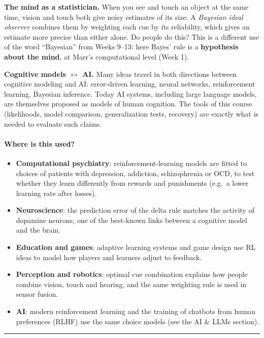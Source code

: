 \textbf{The mind as a statistician.} When you see and touch an object at
the same time, vision and touch both give noisy estimates of its size. A
\emph{Bayesian ideal observer} combines them by weighting each cue by
its reliability, which gives an estimate more precise than either alone.
Do people do this? This is a different use of the word ``Bayesian'' from
Weeks 9--13: here Bayes' rule is a \textbf{hypothesis about the mind},
at Marr's computational level (Week 1).

\textbf{Cognitive models \ensuremath{\leftrightarrow} AI.} Many ideas travel in both directions
between cognitive modeling and AI: error-driven learning, neural
networks, reinforcement learning, Bayesian inference. Today AI systems,
including large language models, are themselves proposed as models of
human cognition. The tools of this course (likelihoods, model
comparison, generalization tests, recovery) are exactly what is needed
to evaluate such claims.

\paragraph{Where is this used?}

\begin{itemize}
\tightlist
\item
  \textbf{Computational psychiatry}: reinforcement-learning models are
  fitted to choices of patients with depression, addiction,
  schizophrenia or OCD, to test whether they learn differently from
  rewards and punishments (e.g.~a lower learning rate after losses).
\item
  \textbf{Neuroscience}: the prediction error of the delta rule matches
  the activity of dopamine neurons, one of the best-known links between
  a cognitive model and the brain.
\item
  \textbf{Education and games}: adaptive learning systems and game
  design use RL ideas to model how players and learners adjust to
  feedback.
\item
  \textbf{Perception and robotics}: optimal cue combination explains how
  people combine vision, touch and hearing, and the same weighting rule
  is used in sensor fusion.
\item
  \textbf{AI}: modern reinforcement learning and the training of
  chatbots from human preferences (RLHF) use the same choice models (see
  the AI \& LLMs section).
\end{itemize}

\begin{center}\rule{0.5\linewidth}{0.5pt}\end{center}

